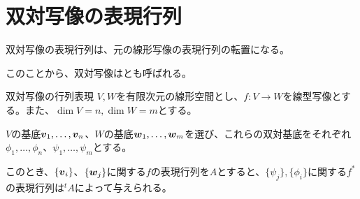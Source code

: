 \documentclass[../../../topic_linear-algebra]{subfiles}
\begin{document}
\sectionline
\section{双対写像の表現行列}

双対写像の表現行列は、元の線形写像の表現行列の転置になる。

このことから、双対写像はとも呼ばれる。

\begin{theorem}{双対写像の行列表現}
  $V,W$を有限次元の線形空間とし、$f\colon V \to W$を線型写像とする。また、$\dim V = n, \dim W = m$とする。
  
  $V$の基底$\vb*{v}_1,\ldots,\vb*{v}_n$、$W$の基底$\vb*{w}_1, \ldots, \vb*{w}_m$を選び、これらの双対基底をそれぞれ$\phi_1, \ldots, \phi_n$、$\psi_1, \ldots, \psi_m$とする。

  このとき、$\{\vb*{v}_i \}$、$\{ \vb*{w}_j\}$に関する$f$の表現行列を$A$とすると、$\{ \psi_j \}, \{ \phi_i \}$に関する$f^*$の表現行列は${}^tA$によって与えられる。
\end{theorem}
\end{document}
